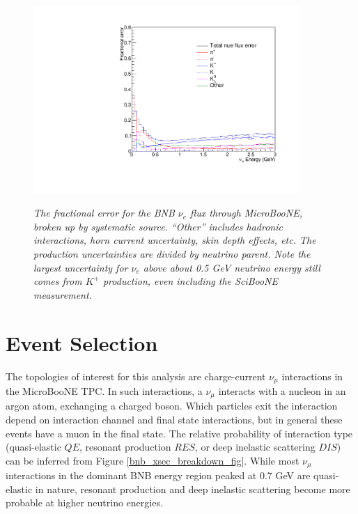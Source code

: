\begin{figure}[ht!]
\centering
	\includegraphics[width=0.9\textwidth]{Figures/UB_nue_fluxerr.pdf} \\
\caption{\textit{The fractional error for the BNB $\nu_e$ flux through MicroBooNE, broken up by systematic source. ``Other'' includes hadronic interactions, horn current uncertainty, skin depth effects, etc. The production uncertainties are divided by neutrino parent. Note the largest uncertainty for $\nu_e$ above about 0.5 GeV neutrino energy still comes from $K^+$ production, even including the SciBooNE measurement.}}\label{UB_nue_fluxerror_fig}
\end{figure}

\section{Event Selection}
The topologies of interest for this analysis are charge-current $\nu_\mu$ interactions in the MicroBooNE TPC. In such interactions, a $\nu_\mu$ interacts with a nucleon in an argon atom, exchanging a charged boson. Which particles exit the interaction depend on interaction channel and final state interactions, but in general these events have a muon in the final state. The relative probability of interaction type (quasi-elastic $QE$, resonant production $RES$, or deep inelastic scattering $DIS$) can be inferred from Figure \ref{bnb_xsec_breakdown_fig}. While most $\nu_\mu$ interactions in the dominant BNB energy region peaked at 0.7 GeV are quasi-elastic in nature, resonant production and deep inelastic scattering become more probable at higher neutrino energies.\\

